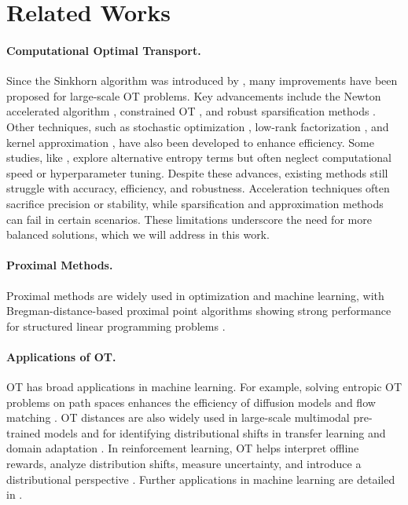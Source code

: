 \section{Related Works}
\paragraph{Computational Optimal Transport.} 
Since the Sinkhorn algorithm was introduced by \citet{cuturi2013sinkhorn}, many improvements have been proposed for large-scale OT problems. Key advancements include the Newton accelerated algorithm \citep{tangaccelerating}, constrained OT \citep{tang2024sinkhorn}, and robust sparsification methods \citep{tang2024safe}. Other techniques, such as stochastic optimization \citep{altschuler2017near}, low-rank factorization \citep{scetbon2021low}, and kernel approximation \citep{solomon2015convolutional,altschuler2019massively,scetbon2020linear,huguet2023geodesic}, have also been developed to enhance efficiency. Some studies, like \citet{benamou2015iterative}, explore alternative entropy terms but often neglect computational speed or hyperparameter tuning. Despite these advances, existing methods still struggle with accuracy, efficiency, and robustness. Acceleration techniques often sacrifice precision or stability, while sparsification and approximation methods can fail in certain scenarios. These limitations underscore the need for more balanced solutions, which we will address in this work.

\paragraph{Proximal Methods.} Proximal methods are widely used in optimization and machine learning, with Bregman-distance-based proximal point algorithms showing strong performance for structured linear programming problems \citep{censor1992proximal,chen1993convergence,eckstein1993nonlinear,eckstein1998approximate,xie2020fast,chu2023efficient}. 

\paragraph{Applications of OT.}
OT has broad applications in machine learning. For example, solving entropic OT problems on path spaces enhances the efficiency of diffusion models \citep{de2021diffusion,wang2021deep} and flow matching \citep{shi2024diffusion}. OT distances are also widely used in large-scale multimodal pre-trained models \citep{wang2023large,wang2024recent} and for identifying distributional shifts in transfer learning and domain adaptation \citep{fatras2021unbalanced,chang2022unified}. In reinforcement learning, OT helps interpret offline rewards, analyze distribution shifts, measure uncertainty, and introduce a distributional perspective \citep{luo2023optimal,wu2024neural,kulinski2023towards,bellemare2017distributional,dabney2018distributional}. Further applications in machine learning are detailed in \citet{torres2021survey,montesuma2024recent}.